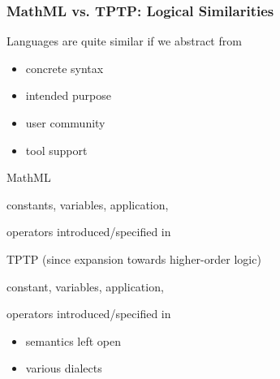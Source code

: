 \documentclass{beamer}
\begin{document}
\begin{frame}\frametitle{MathML vs. TPTP: Logical Similarities}
Languages are quite similar if we abstract from
\vspace{-1em}
\begin{multicols}{2}
\begin{itemize}
  \item concrete syntax
  \item intended purpose
\end{itemize}
\begin{itemize}
  \item user community
  \item tool support
\end{itemize}
\end{multicols}

\begin{blockitems}{MathML}
 \item constants, variables, application, 
 \item {} operators introduced/specified in 
\end{blockitems}
\begin{blockitems}{TPTP (since expansion towards higher-order logic)}
 \item constant, variables, application, 
 \item {} operators introduced/specified in 
 \item {}
   \begin{itemize}
     \item semantics left open
     \item various dialects
   \end{itemize}
\end{blockitems}
\end{frame}
\end{document}
